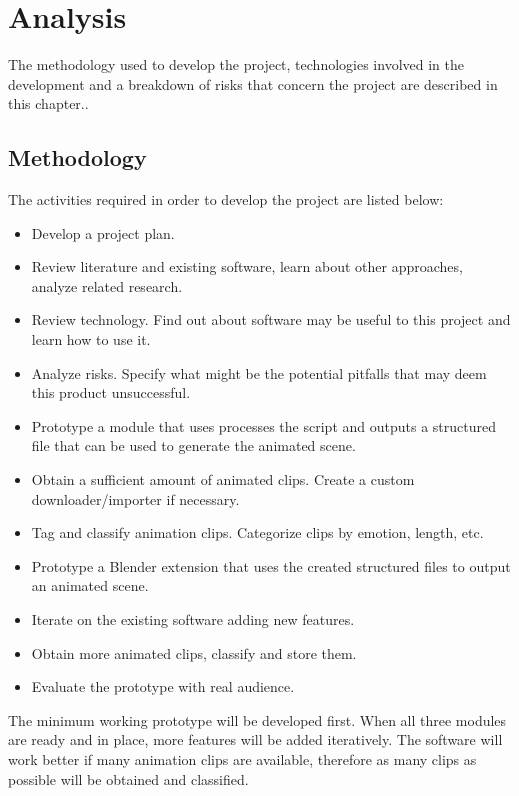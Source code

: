 \chapter{Analysis \label{chap:analysis}}

The methodology used to develop the project, technologies involved in the development and a breakdown of risks that concern the project are described in this chapter..


\section{Methodology}

The activities required in order to develop the project are listed below:

\begin{itemize}
\item Develop a project plan.
\item Review literature and existing software, learn about other approaches, analyze related research.
\item Review technology. Find out about software may be useful to this project and learn how to use it.
\item Analyze risks. Specify what might be the potential pitfalls that may deem this product unsuccessful.
\item Prototype a module that uses processes the script and outputs a structured file that can be used to generate the animated scene.
\item Obtain a sufficient amount of animated clips. Create a custom downloader/importer if necessary.
\item Tag and classify animation clips. Categorize clips by emotion, length, etc.
\item Prototype a Blender extension that uses the created structured files to output an animated scene.
\item Iterate on the existing software adding new features.
\item Obtain more animated clips, classify and store them.
\item Evaluate the prototype with real audience.
\end{itemize}

The minimum working prototype will be developed first. When all three modules are ready and in place, more features will be added iteratively. The software will work better if many animation clips are available, therefore as many clips as possible will be obtained and classified.

